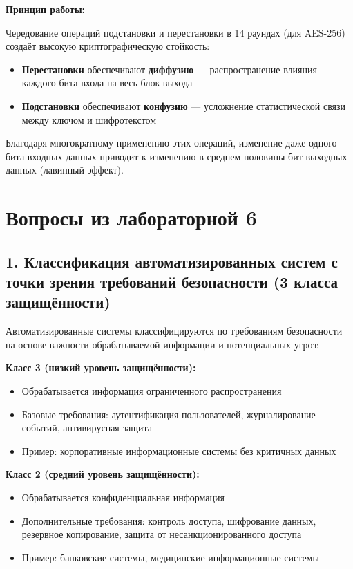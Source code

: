 \textbf{Принцип работы:}

Чередование операций подстановки и перестановки в 14 раундах (для AES-256) создаёт высокую криптографическую стойкость:
\begin{itemize}
    \item \textbf{Перестановки} обеспечивают \textbf{диффузию} — распространение влияния каждого бита входа на весь блок выхода
    \item \textbf{Подстановки} обеспечивают \textbf{конфузию} — усложнение статистической связи между ключом и шифротекстом
\end{itemize}

Благодаря многократному применению этих операций, изменение даже одного бита входных данных приводит к изменению в среднем половины бит выходных данных (лавинный эффект).

\section*{Вопросы из лабораторной 6}

\subsection*{1. Классификация автоматизированных систем с точки зрения требований безопасности (3 класса защищённости)}

Автоматизированные системы классифицируются по требованиям безопасности на основе важности обрабатываемой информации и потенциальных угроз:

\textbf{Класс 3 (низкий уровень защищённости):}
\begin{itemize}
    \item Обрабатывается информация ограниченного распространения
    \item Базовые требования: аутентификация пользователей, журналирование событий, антивирусная защита
    \item Пример: корпоративные информационные системы без критичных данных
\end{itemize}

\textbf{Класс 2 (средний уровень защищённости):}
\begin{itemize}
    \item Обрабатывается конфиденциальная информация
    \item Дополнительные требования: контроль доступа, шифрование данных, резервное копирование, защита от несанкционированного доступа
    \item Пример: банковские системы, медицинские информационные системы
\end{itemize}

